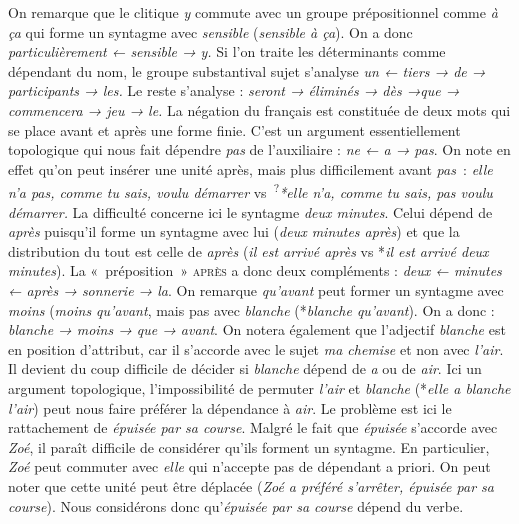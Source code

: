 {    
    \begin{exe}
     On remarque que le clitique \textit{y} commute avec un groupe prépositionnel comme \textit{à ça} qui forme un syntagme avec \textit{sensible} (\textit{sensible à ça}). On a donc \textit{particulièrement ← sensible → y.}
     Si l’on traite les déterminants comme dépendant du nom, le groupe substantival sujet s’analyse \textit{un ← tiers → de → participants → les.} Le reste s’analyse : \textit{seront → éliminés → dès →que → commencera → jeu → le.}
     La négation du français est constituée de deux mots qui se place avant et après une forme finie. C’est un argument essentiellement topologique qui nous fait dépendre \textit{pas} de l’auxiliaire : \textit{ne ← a → pas}. On note en effet qu’on peut insérer une unité après, mais plus difficilement avant \textit{pas~}: \textit{elle n’a pas, comme tu sais, voulu démarrer} vs~\textsuperscript{?}\textit{*elle n’a, comme tu sais, pas voulu démarrer.}
     La difficulté concerne ici le syntagme \textit{deux minutes}. Celui dépend de \textit{après} puisqu’il forme un syntagme avec lui (\textit{deux minutes après}) et que la distribution du tout est celle de \textit{après} (\textit{il est arrivé après} vs *\textit{il est arrivé deux minutes}). La «~préposition~» \textsc{après} a donc deux compléments : \textit{deux ← minutes ← après → sonnerie → la}.
     On remarque \textit{qu’avant} peut former un syntagme avec \textit{moins} (\textit{moins qu’avant}, mais pas avec \textit{blanche} (*\textit{blanche qu’avant}). On a donc : \textit{blanche → moins → que → avant}. On notera également que l’adjectif \textit{blanche} est en position d’attribut, car il s’accorde avec le sujet \textit{ma chemise} et non avec \textit{l’air}. Il devient du coup difficile de décider si \textit{blanche} dépend de \textit{a} ou de \textit{air}. Ici un argument topologique, l’impossibilité de permuter \textit{l’air} et \textit{blanche} (*\textit{elle a blanche l’air}) peut nous faire préférer la dépendance à \textit{air}.
     Le problème est ici le rattachement de \textit{épuisée par sa course}. Malgré le fait que \textit{épuisée} s’accorde avec \textit{Zoé}, il paraît difficile de considérer qu’ils forment un syntagme. En particulier, \textit{Zoé} peut commuter avec \textit{elle} qui n’accepte pas de dépendant a priori. On peut noter que cette unité peut être déplacée (\textit{Zoé a préféré s’arrêter, épuisée par sa course}). Nous considérons donc qu’\textit{épuisée par sa course} dépend du verbe.

\end{exe}}
